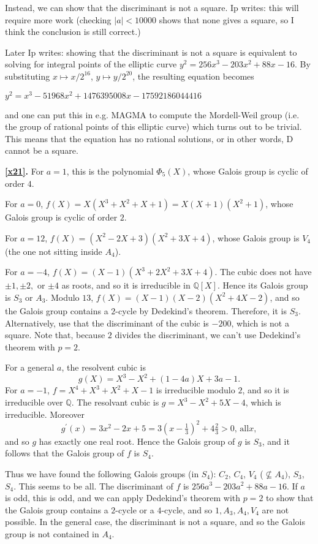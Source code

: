 \documentclass[a4paper,11pt,final,openany]{memoir}
\theoremstyle{nonumberplain}
\begin{document}
Instead, we can show that the discriminant is not a square. Ip writes: this
will require more work (checking $|a|<10000$ shows that none gives a square,
so I think the conclusion is still correct.)

Later Ip writes: showing that the discriminant is not a square is equivalent
to solving for integral points of the elliptic curve $y^{2}=256x^{3}%
-203x^{2}+88x-16$. By substituting $x\mapsto x/2^{16}$, $y\mapsto y/2^{20}$,
the resulting equation becomes

$y^{2}= x^{3}-51968x^{2} + 1476395008 x-17592186044416$

and one can put this in e.g. MAGMA to compute the Mordell-Weil group (i.e. the
group of rational points of this elliptic curve) which turns out to be
trivial. This means that the equation has no rational solutions, or in other
words, D cannot be a square.

\medskip\noindent\textbf{\ref{x21}.} For $a=1$, this is the polynomial
$\Phi_{5}(X)$, whose Galois group is cyclic of order $4$.

\noindent For $a=0$, $f(X)=X(X^{3}+X^{2}+X+1)=X(X+1)(X^{2}+1)$, whose Galois
group is cyclic of order $2$.

\noindent For $a=12$, $f(X)=(X^{2}-2X+3)(X^{2}+3X+4)$, whose Galois group is
$V_{4}$ (the one not sitting inside $A_{4}$).

\noindent For $a=-4$, $f(X)=(X-1)(X^{3}+2X^{2}+3X+4)$. The cubic does not have
$\pm1,\pm2,$ or $\pm4$ as roots, and so it is irreducible in ${\mathbb{Q}}%
[X]$. Hence its Galois group is $S_{3}$ or $A_{3}$. Modulo $13$,
$f(X)=(X-1)(X-2)(X^{2}+4X-2)$, and so the Galois group contains a $2$-cycle by
Dedekind's theorem. Therefore, it is $S_{3}$. Alternatively, use that the
discriminant of the cubic is $-200$, which is not a square. Note that, because
$2$ divides the discriminant, we can't use Dedekind's theorem with $p=2$.

\noindent For a general $a$, the resolvent cubic is
\[
g(X)=X^{3}-X^{2}+(1-4a)X+3a-1.
\]
For $a=-1$, $f=X^{4}+X^{3}+X^{2}+X-1$ is irreducible modulo $2$, and so it is
irreducible over $\mathbb{Q}{}$. The resolvant cubic is $g=X^{3}-X^{2}+5X-4$,
which is irreducible. Moreover
\[
g^{\prime}(x)=3x^{2}-2x+5=3(x-\tfrac{1}{3})^{2}+4\tfrac{2}{3}>0\text{, all
}x,
\]
and so $g$ has exactly one real root. Hence the Galois group of $g$ is $S_{3}%
$, and it follows that the Galois group of $f$ is $S_{4}$.

Thus we have found the following Galois groups (in $S_{4}$): $C_{2}$, $C_{4}$,
$V_{4}$ ($\nsubseteq A_{4})$, $S_{3}$, $S_{4}$. This seems to be all. The
discriminant of $f$ is $256a^{3}-203a^{2}+88a-16$. If $a$ is odd, this is odd,
and we can apply Dedekind's theorem with $p=2$ to show that the Galois group
contains a $2$-cycle or a $4$-cycle, and so $1,A_{3},A_{4},V_{4}$ are not
possible. In the general case, the discriminant is not a square, and so the
Galois group is not contained in $A_{4}$.
\end{document}

